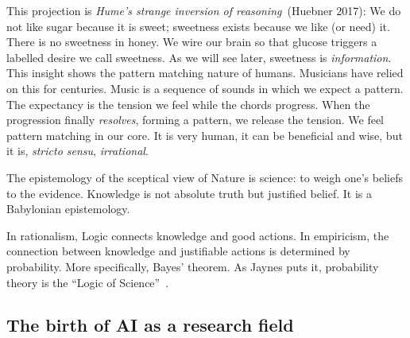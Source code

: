 \documentclass[
  letterpaper,
  12pt,
  british]{tufte-book}
\theoremstyle{plain}
\theoremstyle{plain}
\theoremstyle{definition}
\theoremstyle{remark}
\begin{document}
This projection is \emph{Hume's strange inversion of reasoning}~(Huebner
2017):
We do not like sugar because it is sweet; sweetness exists because we
like (or need) it. There is no sweetness in
honey.\protect\hypertarget{honey}{}{} We wire our brain so that glucose
triggers a labelled desire we call sweetness. As we will see later,
sweetness is \emph{information}. This insight shows the pattern matching
nature of humans. Musicians have relied on this for centuries. Music is
a sequence of sounds in which we expect a pattern. The expectancy is the
tension we feel while the chords progress. When the progression finally
\emph{resolves}, forming a pattern, we release the tension. We feel
pattern matching in our core. It is very human, it can be beneficial and
wise, but it is, \emph{stricto sensu}, \emph{irrational}.

The epistemology of the sceptical view of Nature is science: to weigh
one's beliefs to the evidence. Knowledge is not absolute truth but
justified belief. It is a Babylonian epistemology.

In rationalism, Logic connects knowledge and good actions. In
empiricism, the connection between knowledge and justifiable actions is
determined by probability. More specifically, Bayes' theorem. As Jaynes
puts it, probability theory is the ``Logic of Science''~. 

\hypertarget{the-birth-of-ai-as-a-research-field}{%
\subsection{The birth of AI as a research
field}\label{the-birth-of-ai-as-a-research-field}}
\end{document}
